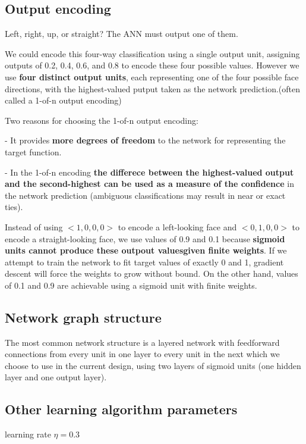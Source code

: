 \subsection*{Output encoding}

Left, right, up, or straight? The ANN must output one of them.

We could encode this four-way classification using a single output unit, assigning outputs of 0.2, 0.4, 0.6, and 0.8 to encode these four possible values. However we use \textbf{four distinct output units}, each representing one of the four possible face directions, with the highest-valued putput taken as the network prediction.(often called a 1-of-n output encoding)

Two reasons for choosing the 1-of-n output encoding:

- It provides \textbf{more degrees of freedom} to the network for representing the target function.

- In the 1-of-n encoding \textbf{the differece between the highest-valued output and the second-highest can be used as a measure of the confidence} in the network prediction (ambiguous classifications may result in near or exact ties).

Instead of using $<1,0,0,0>$ to encode a left-looking face and $<0,1,0,0>$ to encode a straight-looking face, we use values of 0.9 and 0.1 because \textbf{sigmoid units cannot produce these outpout valuesgiven finite weights}. If we attempt to train the network to fit target values of exactly 0 and 1, gradient descent will force the weights to grow without bound. On the other hand, values of 0.1 and 0.9 are achievable using a sigmoid unit with finite weights.

\subsection*{Network graph structure}

The most common network structure is a layered network with feedforward connections from every unit in one layer to every unit in the next which we choose to use in the current design, using two layers of sigmoid units (one hidden layer and one output layer).

\subsection*{Other learning algorithm parameters}

learning rate $\eta = 0.3$

